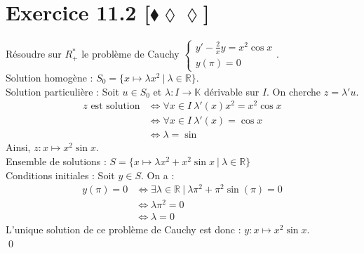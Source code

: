 \documentclass[10pt]{article}
\begin{document}
\section*{Exercice 11.2 [$\blacklozenge\lozenge\lozenge$]}
\begin{tcolorbox}[enhanced, width=7in, center, size=fbox, fontupper=\large, drop shadow southwest]
    Résoudre sur $R_+^*$ le problème de Cauchy $\begin{cases} y' - \frac{2}{x}y = x^2\cos x\\ y(\pi)=0 \end{cases}$.\\
    Solution homogène : $S_0 = \{x \mapsto \lambda x^2 ~ | ~ \lambda \in\mathbb{R}\}$.\\
    Solution particulière : Soit $u\in S_0$ et $\lambda : I \rightarrow \mathbb{K}$ dérivable sur $I$. On cherche $z = \lambda'u$.
    \begin{align*}
        z \text{ est solution} &\iff \forall{x\in I} ~ \lambda'(x)x^2 = x^2\cos x\\
        &\iff \forall{x\in I} ~ \lambda'(x) = \cos x\\
        &\iff \lambda = \sin
    \end{align*}
    Ainsi, $z:x\mapsto x^2\sin x$.\\
    Ensemble de solutions : $S=\{x\mapsto\lambda x^2 + x^2\sin x ~ | ~ \lambda \in \mathbb{R}\}$\\
    Conditions initiales : Soit $y \in S$. On a :
    \begin{align*}
        y(\pi) = 0 &\iff \exists{\lambda\in\mathbb{R}} ~ | ~ \lambda\pi^2 + \pi^2\sin(\pi) = 0\\
        &\iff \lambda\pi^2 = 0\\
        &\iff \lambda = 0
    \end{align*}
    L'unique solution de ce problème de Cauchy est donc : $y:x\mapsto x^2\sin x$.\\
    \qed
\end{tcolorbox}

\end{document}
